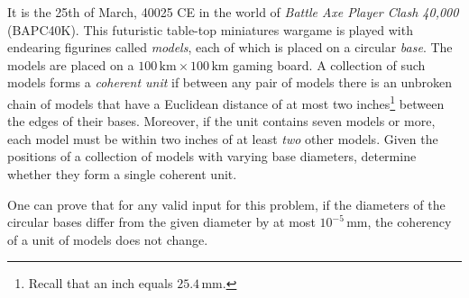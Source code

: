 


It is the 25th of March, 40025 CE
in the world of \emph{Battle Axe Player Clash 40,000} (BAPC40K).  %
This futuristic table-top miniatures wargame
is played with endearing figurines called \emph{models}, each of which is placed on a circular \emph{base}.
The models are placed on a $100\,\text{km} \times 100\,\text{km}$ gaming board.
A collection of such models forms a \emph{coherent unit} if between any pair of models there is an unbroken chain of models
that have a Euclidean distance of at most two inches\footnote{%
    Recall that an inch equals $25.4\,\text{mm}$.
} between the edges of their bases.
Moreover,
if the unit contains seven models or more,
each model must be within two inches of at least \emph{two} other models.
Given the positions of a collection of models with varying base diameters,
determine whether they form a single coherent unit.

One can prove that for any valid input for this problem,
if the diameters of the circular bases differ from the given diameter by at most $10^{-5}\,\text{mm}$,
the coherency of a unit of models does not change.

